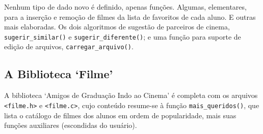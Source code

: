 \documentclass[12pt,a4paper,portuguese]{article}
\begin{document}
        Nenhum tipo de dado novo é definido, apenas funções. Algumas, elementares, para a inserção e remoção de filmes da lista de favoritos de cada aluno. E outras mais elaboradas. Os dois algoritmos de sugestão de parceiros de cinema, \verb|sugerir_similar()| e \verb|sugerir_diferente()|; e uma função para suporte de edição de arquivos, \verb|carregar_arquivo()|.

    \subsection{A Biblioteca `Filme'}
        A biblioteca `Amigos de Graduação Indo ao Cinema' é completa com os arquivos \verb|<filme.h>| e \verb|<filme.c>|, cujo conteúdo resume-se à função \verb|mais_queridos()|, que lista o catálogo de filmes dos alunos em ordem de popularidade, mais suas funções auxiliares (escondidas do usuário).
\end{document}
